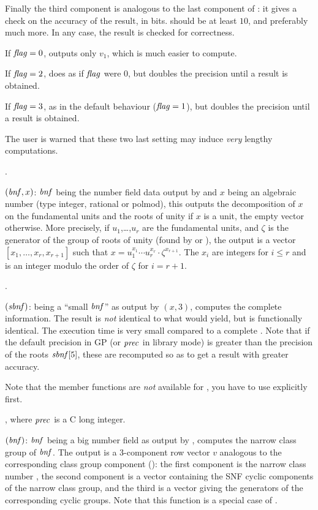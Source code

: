   Finally the third component  is analogous to the last component of
: it gives a check on the accuracy of the result, in bits.
 should be at least $10$, and preferably much more. In any case, the
result is checked for correctness.

If $\hbox{\it f\kern0pt lag\/}=0$, outputs only $v_1$, which is much easier to compute.

If $\hbox{\it f\kern0pt lag\/}=2$, does as if $\hbox{\it f\kern0pt lag\/}$ were $0$, but doubles the precision until a
result is obtained.

If $\hbox{\it f\kern0pt lag\/}=3$, as in the default behaviour ($\hbox{\it f\kern0pt lag\/}=1$), but doubles the precision
until a result is obtained.

The user is warned that these two last setting may induce \emph{very} lengthy
computations.

.

$(\hbox{\it bnf\/},x)$: $\hbox{\it bnf\/}$ being the number field data
output by
 and $x$ being an algebraic number (type integer, rational or
polmod), this outputs the decomposition of $x$ on the fundamental units and
the roots of unity if $x$ is a unit, the empty vector otherwise. More
precisely, if $u_1$,\dots,$u_r$ are the fundamental units, and $\zeta$ is
the generator of the group of roots of unity (found by  or
), the output is a vector $[x_1,\dots,x_r,x_{r+1}]$ such that
$x=u_1^{x_1}\cdots u_r^{x_r}\cdot\zeta^{x_{r+1}}$. The $x_i$ are integers for
$i\le r$ and is an integer modulo the order of $\zeta$ for $i=r+1$.

.

$(\hbox{\it sbnf\/})$:  being a ``small $\hbox{\it bnf\/}$''
as output by $(x,3)$, computes the complete 
information. The result is \emph{not} identical to what  would
yield, but is functionally identical. The execution time is very small
compared to a complete . Note that if the default precision in
GP (or $\hbox{\it prec\/}$ in library mode) is greater than the precision of the
roots $\hbox{\it sbnf\/}[5]$, these are recomputed so as to get a result with
greater accuracy.

Note that the member functions are \emph{not} available for , you
have to use  explicitly first.

, where $\hbox{\it prec\/}$ is a
C long integer.

$(\hbox{\it bnf\/})$: $\hbox{\it bnf\/}$ being a big number field as
output by , computes the narrow class group of $\hbox{\it bnf\/}$. The
output is a 3-component row vector $v$ analogous to the corresponding
class group component  (): the
first component is the narrow class number , the second component
is a vector containing the SNF cyclic components
 of the narrow
class group, and the third is a vector giving the generators of the
corresponding  cyclic groups. Note that this function is a
special case of .

